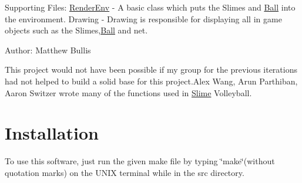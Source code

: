 Supporting Files\-: \hyperlink{classRenderEnv}{Render\-Env} -\/ A basic class which puts the Slimes and \hyperlink{classBall}{Ball} into the environment. Drawing -\/ Drawing is responsible for displaying all in game objects such as the Slimes,\hyperlink{classBall}{Ball} and net.

Author\-: Matthew Bullis

This project would not have been possible if my group for the previous iterations had not helped to build a solid base for this project.\-Alex Wang, Arun Parthiban, Aaron Switzer wrote many of the functions used in \hyperlink{classSlime}{Slime} Volleyball.\hypertarget{index_install_sec}{}\section{Installation}\label{index_install_sec}
To use this software, just run the given make file by typing \char`\"{}make\char`\"{}(without quotation marks) on the U\-N\-I\-X terminal while in the src directory. 